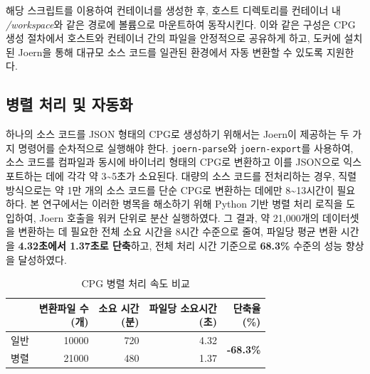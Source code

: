 해당 스크립트를 이용하여 컨테이너를 생성한 후, 호스트 디렉토리를 컨테이너 내 \textit{/workspace}와 같은 경로에 볼륨으로 마운트하여 동작시킨다.
이와 같은 구성은 CPG 생성 절차에서 호스트와 컨테이너 간의 파일을 안정적으로 공유하게 하고, 도커에 설치된 Joern을 통해 대규모 소스 코드를 일관된 환경에서 자동 변환할 수 있도록 지원한다.

\subsection{병렬 처리 및 자동화}

하나의 소스 코드를 JSON 형태의 CPG로 생성하기 위해서는 Joern이 제공하는 두 가지 명령어를 순차적으로 실행해야 한다. \verb|joern-parse|와 \verb|joern-export|를 사용하여, 소스 코드를 컴파일과 동시에 바이너리 형태의 CPG로 변환하고 이를 JSON으로 익스포트하는 데에 각각 약 3\textasciitilde5초가 소요된다.
대량의 소스 코드를 전처리하는 경우, 직렬 방식으로는 약 1만 개의 소스 코드를 단순 CPG로 변환하는 데에만 8\textasciitilde13시간이 필요하다.
본 연구에서는 이러한 병목을 해소하기 위해 Python 기반 병렬 처리 로직을 도입하여, Joern 호출을 워커 단위로 분산 실행하였다.
그 결과, 약 21{,}000개의 데이터셋을 변환하는 데 필요한 전체 소요 시간을 8시간 수준으로 줄여, 파일당 평균 변환 시간을 \textbf{4.32초에서 1.37초로 단축}하고, 전체 처리 시간 기준으로 \textbf{68.3\%} 수준의 성능 향상을 달성하였다.


\begin{table}[H]
\centering
\begin{tabular*}{0.8\textwidth}{@{\extracolsep{\fill}} lrrrr}
\toprule
 & \makecell[r]{변환파일 수 \\ (개)} & \makecell[r]{소요 시간 \\ (분)} & \makecell[r]{파일당 소요시간 \\ (초)} & \makecell[r]{단축율 \\ (\%)} \\ \midrule
일반 & 10000 & 720 & 4.32 & \multirow{2}{*}{\textbf{-68.3\%}} \\
병렬 & 21000 & 480 & 1.37 &  \\ \bottomrule
\end{tabular*}
\caption{CPG 병렬 처리 속도 비교}
\label{tab:cpg-convertion-time-table}
\end{table}